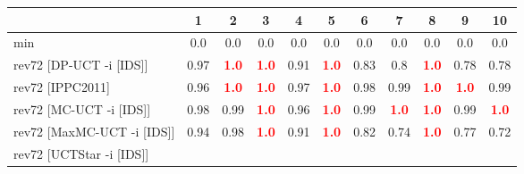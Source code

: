 \documentclass{article}
\begin{document}
\begin{tabular}{|l|r@{$\pm$}rr@{$\pm$}rr@{$\pm$}rr@{$\pm$}rr@{$\pm$}rr@{$\pm$}rr@{$\pm$}rr@{$\pm$}rr@{$\pm$}rr@{$\pm$}r|}
\hline

& \multicolumn{2}{c}{1}
& \multicolumn{2}{c}{2}
& \multicolumn{2}{c}{3}
& \multicolumn{2}{c}{4}
& \multicolumn{2}{c}{5}
& \multicolumn{2}{c}{6}
& \multicolumn{2}{c}{7}
& \multicolumn{2}{c}{8}
& \multicolumn{2}{c}{9}
& \multicolumn{2}{c|}{10}
\\
\hline
\hline
min
& \multicolumn{2}{c}{0.0}
& \multicolumn{2}{c}{0.0}
& \multicolumn{2}{c}{0.0}
& \multicolumn{2}{c}{0.0}
& \multicolumn{2}{c}{0.0}
& \multicolumn{2}{c}{0.0}
& \multicolumn{2}{c}{0.0}
& \multicolumn{2}{c}{0.0}
& \multicolumn{2}{c}{0.0}
& \multicolumn{2}{c|}{0.0}
\\
rev72 [DP-UCT -i [IDS]]
& \multicolumn{2}{c}{0.97}
& \multicolumn{2}{c}{\textbf{\textcolor{red}{1.0}}}
& \multicolumn{2}{c}{\textbf{\textcolor{red}{1.0}}}
& \multicolumn{2}{c}{0.91}
& \multicolumn{2}{c}{\textbf{\textcolor{red}{1.0}}}
& \multicolumn{2}{c}{0.83}
& \multicolumn{2}{c}{0.8}
& \multicolumn{2}{c}{\textbf{\textcolor{red}{1.0}}}
& \multicolumn{2}{c}{0.78}
& \multicolumn{2}{c|}{0.78}
\\
rev72 [IPPC2011]
& \multicolumn{2}{c}{0.96}
& \multicolumn{2}{c}{\textbf{\textcolor{red}{1.0}}}
& \multicolumn{2}{c}{\textbf{\textcolor{red}{1.0}}}
& \multicolumn{2}{c}{0.97}
& \multicolumn{2}{c}{\textbf{\textcolor{red}{1.0}}}
& \multicolumn{2}{c}{0.98}
& \multicolumn{2}{c}{0.99}
& \multicolumn{2}{c}{\textbf{\textcolor{red}{1.0}}}
& \multicolumn{2}{c}{\textbf{\textcolor{red}{1.0}}}
& \multicolumn{2}{c|}{0.99}
\\
rev72 [MC-UCT -i [IDS]]
& \multicolumn{2}{c}{0.98}
& \multicolumn{2}{c}{0.99}
& \multicolumn{2}{c}{\textbf{\textcolor{red}{1.0}}}
& \multicolumn{2}{c}{0.96}
& \multicolumn{2}{c}{\textbf{\textcolor{red}{1.0}}}
& \multicolumn{2}{c}{0.99}
& \multicolumn{2}{c}{\textbf{\textcolor{red}{1.0}}}
& \multicolumn{2}{c}{\textbf{\textcolor{red}{1.0}}}
& \multicolumn{2}{c}{0.99}
& \multicolumn{2}{c|}{\textbf{\textcolor{red}{1.0}}}
\\
rev72 [MaxMC-UCT -i [IDS]]
& \multicolumn{2}{c}{0.94}
& \multicolumn{2}{c}{0.98}
& \multicolumn{2}{c}{\textbf{\textcolor{red}{1.0}}}
& \multicolumn{2}{c}{0.91}
& \multicolumn{2}{c}{\textbf{\textcolor{red}{1.0}}}
& \multicolumn{2}{c}{0.82}
& \multicolumn{2}{c}{0.74}
& \multicolumn{2}{c}{\textbf{\textcolor{red}{1.0}}}
& \multicolumn{2}{c}{0.77}
& \multicolumn{2}{c|}{0.72}
\\
rev72 [UCTStar -i [IDS]]

\end{tabular}
\end{document}
